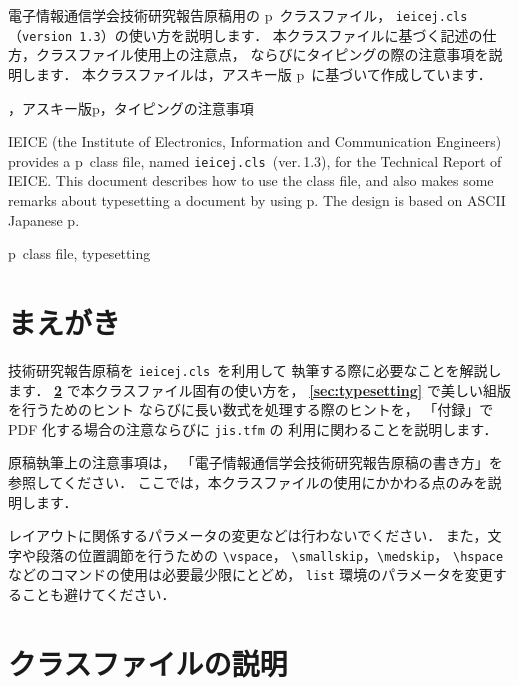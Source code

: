 \documentclass[technicalreport]{ieicej}
\def\IEICEJcls{\texttt{ieicej.cls}}
\def\IEICEver{1.3}
\begin{document}
\begin{jabstract}
電子情報通信学会技術研究報告原稿用の p\LaTeXe\ クラスファイル，
\IEICEJcls{}（\texttt{version \IEICEver}）の使い方を説明します．
本クラスファイルに基づく記述の仕方，クラスファイル使用上の注意点，
ならびにタイピングの際の注意事項を説明します．
本クラスファイルは，アスキー版 p\LaTeXe\ に基づいて作成しています．
\end{jabstract}
\begin{jkeyword}
\LaTeXe{}，アスキー版p\LaTeXe{}，タイピングの注意事項
\end{jkeyword}
\begin{eabstract}
IEICE (the Institute of Electronics, Information 
and Communication Engineers) provides 
a p\LaTeXe\ class file, named \IEICEJcls\ (ver.\,\IEICEver), 
for the Technical Report of IEICE. 
This document describes how to use the class file, 
and also makes some remarks about typesetting a document by using p\LaTeXe. 
The design is based on ASCII Japanese p\LaTeXe. 
\end{eabstract}
\begin{ekeyword}
p\LaTeXe\ class file, typesetting
\end{ekeyword}
\maketitle

\section{まえがき}

技術研究報告原稿を \IEICEJcls\ を利用して
執筆する際に必要なことを解説します．
{\bfseries \ref{sec:cls}} で本クラスファイル固有の使い方を，
{\bfseries \ref{sec:typesetting}} で美しい組版を行うためのヒント
ならびに長い数式を処理する際のヒントを，
「付録」で PDF 化する場合の注意ならびに \texttt{jis.tfm} の
利用に関わることを説明します．

原稿執筆上の注意事項は，
「電子情報通信学会技術研究報告原稿の書き方」を参照してください．
ここでは，本クラスファイルの使用にかかわる点のみを説明します．

レイアウトに関係するパラメータの変更などは行わないでください．
また，文字や段落の位置調節を行うための \verb/\vspace/，
\verb/\smallskip/，\verb/\medskip/，
\verb/\hspace/ などのコマンドの使用は必要最少限にとどめ，
\texttt{list} 環境のパラメータを変更することも避けてください．

\section{クラスファイルの説明}
\label{sec:cls}
\end{document}
